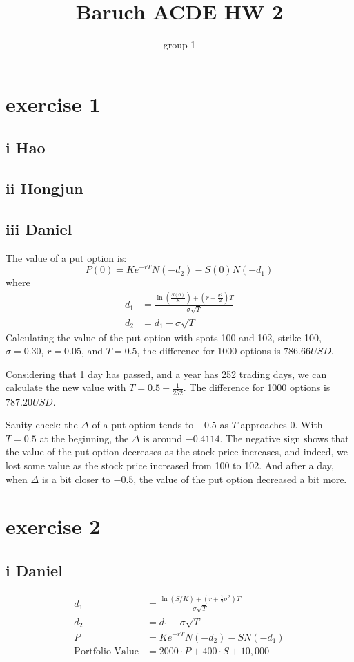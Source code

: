 \documentclass{article}
\title{Baruch ACDE HW 2}
\author{group 1}
\begin{document}
\maketitle
\tableofcontents
\section{exercise 1}
\subsection{i Hao}
\subsection{ii Hongjun}
\subsection{iii Daniel}
The value of a put option is:
\[P(0) = K e^{-rT} N(-d_2) - S(0) N(-d_1)\]
where
\begin{align*}
    d_1 & = \frac{\ln\left(\frac{S(0)}{K}\right) + \left(r + \frac{\sigma^2}{2}\right)T}{\sigma\sqrt{T}} \\
    d_2 & = d_1 - \sigma\sqrt{T}
\end{align*}
Calculating the value of the put option with spots 100 and 102,
strike 100, $\sigma = 0.30$, $r = 0.05$, and $T = 0.5$,
the difference for 1000 options is $786.66USD$.

Considering that 1 day has passed, and a year has 252 trading days,
we can calculate the new value with $T = 0.5 - \frac{1}{252}$.
The difference for 1000 options is $787.20USD$.

Sanity check: the $\Delta$ of a put option tends to $-0.5$ as $T$ approaches 0.
With $T=0.5$ at the beginning, the $\Delta$ is around $-0.4114$.
The negative sign shows that the value of the put option decreases as the stock price increases,
and indeed, we lost some value as the stock price increased from 100 to 102.
And after a day, when $\Delta$ is a bit closer to $-0.5$,
the value of the put option decreased a bit more.


\section{exercise 2}
\subsection{i Daniel}


\begin{align*}
    d_1                    & = \frac{\ln(S/K) + \left(r + \frac{1}{2} \sigma^2\right) T}{\sigma \sqrt{T}} \\
    d_2                    & = d_1 - \sigma \sqrt{T}                                                      \\
    P                      & = K e^{-rT} N(-d_2) - S N(-d_1)                                              \\
    \text{Portfolio Value} & = 2000 \cdot P + 400 \cdot S + 10,\!000
\end{align*}
\end{document}
